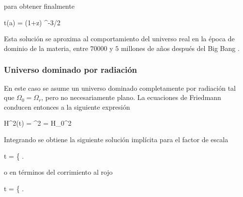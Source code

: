 para obtener finalmente


{ t(a) =  (1+z) ^{-3/2} }


Esta solución se aproxima al comportamiento del universo real en la época
de dominio de la materia, entre $70000$ y $5$ millones de años después del 
Big Bang \cite{padmanabhan1995}.


			\subsubsection*{Universo dominado por radiación}

En este caso se asume un universo dominado completamente por radiación tal
que $\Omega_0 = \Omega_r$, pero no necesariamente plano. La ecuaciones de 
Friedmann conducen entonces a la siguiente expresión


{ H^2(t) = ^2 = H_0^2  }


Integrando se obtiene la siguiente solución implícita para el factor de 
escala


{ t = \left\{   \right. }


o en términos del corrimiento al rojo


{ t = \left\{   \right. }


